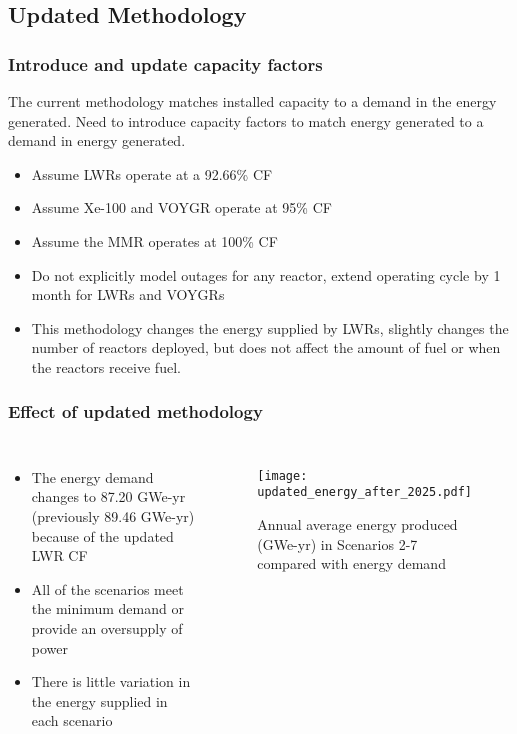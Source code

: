 \subsection{Updated Methodology}
\begin{frame}
    \frametitle{Introduce and update capacity factors}
    The current methodology matches installed capacity to a demand 
    in the energy generated. Need to introduce capacity factors to 
    match energy generated to a demand in energy generated.
    \begin{itemize}
        \item Assume \glspl{LWR} operate at a 92.66\% 
              \gls{CF} \cite{us_eia_monthly_2022}
        \item Assume Xe-100 and VOYGR operate at 95\% \gls{CF}
              \cite{xenergy_reactor_nodate,nuscale_technology_nodate}
        \item Assume the \gls{MMR} operates at 100\% \gls{CF}
        \item Do not explicitly model outages for any reactor, extend 
              operating cycle by 1 month for \glspl{LWR} and VOYGRs
        \item This methodology changes the energy supplied by \glspl{LWR}, 
              slightly changes the number of reactors deployed,
              but does not affect the amount of fuel or when the reactors 
              receive fuel. 
    \end{itemize}
\end{frame}

\begin{frame}
    \frametitle{Effect of updated methodology}
    \begin{columns}
        \column[t]{5cm}
            \begin{itemize}
                \item The energy demand changes to 87.20 GWe-yr (previously 
                      89.46 GWe-yr) because 
                      of the updated LWR \gls{CF}
                \item All of the scenarios meet the minimum demand or 
                      provide an oversupply of power
                \item There is little variation in the energy supplied
                      in each scenario
            \end{itemize}
        \column[t]{5cm}
        \vspace{-0.8cm}
            \begin{figure}
                \centering
                \texttt{[image: updated\_energy\_after\_2025.pdf]}
                \caption{Annual average energy produced (GWe-yr) in Scenarios 
                2-7 compared with energy demand}
                \label{fig:updated_energy}

        \end{figure}
    \end{columns}
\end{frame}

